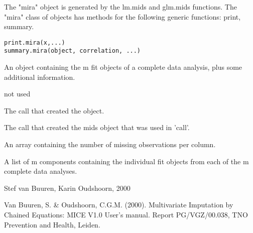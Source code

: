 \begin{Description}\relax
The "mira" object is generated by the lm.mids and glm.mids functions.
The "mira" class of objects has methods for the following generic functions:
print, summary.
\end{Description}
\begin{Usage}
\begin{verbatim}
print.mira(x,...)
summary.mira(object, correlation, ...)
\end{verbatim}
\end{Usage}
\begin{Arguments}
\begin{ldescription}
\item[\code{x, object}] An object containing the m fit objects of a complete data analysis, 
plus some additional information.
\item[\code{correlation}] 
\item[\code{...}] not used
\end{ldescription}
\end{Arguments}
\begin{Value}
\begin{ldescription}
\item[\code{call}] The call that created the object.
\item[\code{call1}] The call that created the mids object that was used in 'call'.
\item[\code{nmis}] An array containing the number of missing observations per column.
\item[\code{analyses}] A list of m components containing the individual fit objects from each of the m complete data analyses.
\end{ldescription}
\end{Value}
\begin{Author}\relax
Stef van Buuren, Karin Oudshoorn, 2000
\end{Author}
\begin{References}\relax
Van Buuren, S. \& Oudshoorn, C.G.M. (2000). Multivariate Imputation by Chained Equations: 
MICE V1.0 User's manual. Report PG/VGZ/00.038, TNO Prevention and Health, Leiden.
\end{References}

